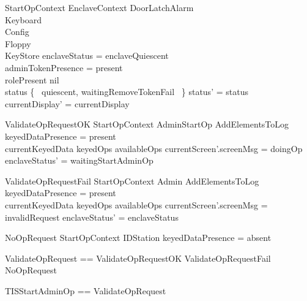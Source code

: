 \begin{schema}{StartOpContext}
        EnclaveContext
\also
        \Xi DoorLatchAlarm
\\      \Xi Keyboard
\\      \Xi Config
\\      \Xi Floppy
\\      \Xi KeyStore
\where
        enclaveStatus = enclaveQuiescent
\\      adminTokenPresence = present
\\      rolePresent \neq nil
\\      status \in \{~ quiescent, waitingRemoveTokenFail ~\}
\also
        status' = status
\\      currentDisplay' = currentDisplay
\end{schema}

\begin{schema}{ValidateOpRequestOK}
        StartOpContext
\also
        AdminStartOp
\also
        AddElementsToLog
\where
        keyedDataPresence = present
\\      currentKeyedData  \in keyedOps \limg availableOps \rimg
\also
        currentScreen'.screenMsg = doingOp
\also
        enclaveStatus' = waitingStartAdminOp
\end{schema}

\begin{schema}{ValidateOpRequestFail}
        StartOpContext
\also
        \Xi Admin
\also
        AddElementsToLog
\where
        keyedDataPresence = present
\\      currentKeyedData  \notin keyedOps \limg availableOps \rimg
\also
        currentScreen'.screenMsg = invalidRequest
\also
        enclaveStatus' = enclaveStatus
\end{schema}

\begin{schema}{NoOpRequest}
        StartOpContext
\also
        \Xi IDStation
\where
        keyedDataPresence = absent
\end{schema}

\begin{zed}
        ValidateOpRequest == ValidateOpRequestOK \lor
        ValidateOpRequestFail \lor NoOpRequest
\end{zed}

\begin{zed}
        TISStartAdminOp == ValidateOpRequest
\end{zed}

